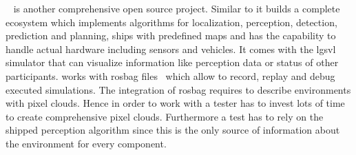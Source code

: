 \autoware{}~\cite{autoware, autowareOpen, autowareOnBoard} is another comprehensive open source project.
Similar to \apollo{} it builds a complete ecosystem which implements algorithms for localization, perception, detection, prediction and planning, ships with predefined maps and has the capability to handle actual hardware including sensors and vehicles.
It comes with the \gls{lgsvl} simulator that can visualize information like perception data or status of other participants.
\autoware{} works with \gls{rosbag} files~\cite{rosbag} which allow to record, replay and debug executed simulations.
The integration of \gls{rosbag} requires \autoware{} to describe environments with pixel clouds.
Hence in order to work with \autoware{} a tester has to invest lots of time to create comprehensive pixel clouds.
Furthermore a test has to rely on the shipped perception algorithm since this is the only source of information about the environment for every component.

